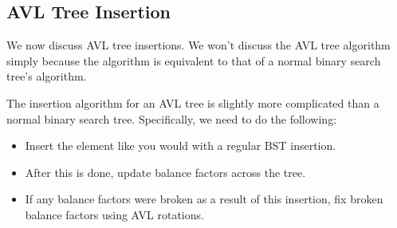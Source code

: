 \documentclass[letterpaper]{article}
\begin{document}
\subsection{AVL Tree Insertion}
We now discuss AVL tree insertions. We won't discuss the AVL tree  algorithm simply because the  algorithm is equivalent to that of a normal binary search tree's  algorithm. 

\bigskip 

The insertion algorithm for an AVL tree is slightly more complicated than a normal binary search tree. Specifically, we need to do the following: 
\begin{itemize}
    \item Insert the element like you would with a regular BST insertion. 
    \item After this is done, update balance factors across the tree. 
    \item If any balance factors were broken as a result of this insertion, fix broken balance factors using AVL rotations. 
\end{itemize}
\end{document}
